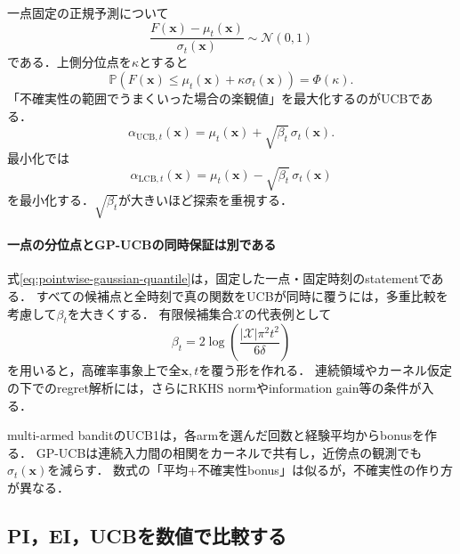 \documentclass[a4paper,11pt]{ltjsarticle}
\newcommand{\Pp}{\mathbb P}
\newcommand{\N}{\mathcal N}
\begin{document}
一点固定の正規予測について
\begin{equation}
  \frac{F(\bm x)-\mu_t(\bm x)}{\sigma_t(\bm x)}\sim\N(0,1)
\end{equation}
である．上側分位点を\(\kappa\)とすると
\begin{equation}
  \Pp\left(
  F(\bm x)\leq\mu_t(\bm x)+\kappa\sigma_t(\bm x)
  \right)=\Phi(\kappa).
  \label{eq:pointwise-gaussian-quantile}
\end{equation}
「不確実性の範囲でうまくいった場合の楽観値」を最大化するのがUCBである．
\begin{equation}
  \boxed{
  \alpha_{\mathrm{UCB},t}(\bm x)
  =\mu_t(\bm x)+\sqrt{\beta_t}\,\sigma_t(\bm x).}
  \label{eq:gp-ucb}
\end{equation}
最小化では
\begin{equation}
  \alpha_{\mathrm{LCB},t}(\bm x)
  =\mu_t(\bm x)-\sqrt{\beta_t}\,\sigma_t(\bm x)
  \label{eq:gp-lcb}
\end{equation}
を最小化する．\(\sqrt{\beta_t}\)が大きいほど探索を重視する．

\paragraph{一点の分位点とGP-UCBの同時保証は別である}
式\eqref{eq:pointwise-gaussian-quantile}は，固定した一点・固定時刻のstatementである．
すべての候補点と全時刻で真の関数をUCBが同時に覆うには，多重比較を考慮して\(\beta_t\)を大きくする．
有限候補集合\(\mathcal X\)の代表例として
\begin{equation}
  \beta_t
  =2\log\left(
  \frac{|\mathcal X|\pi^2t^2}{6\delta}
  \right)
  \label{eq:finite-domain-beta}
\end{equation}
を用いると，高確率事象上で全\(\bm x,t\)を覆う形を作れる\citep{srinivas2010gpucb}．
連続領域やカーネル仮定の下でのregret解析には，さらにRKHS normやinformation gain等の条件が入る．

\begin{cautionbox}
multi-armed banditのUCB1は，各armを選んだ回数と経験平均からbonusを作る．
GP-UCBは連続入力間の相関をカーネルで共有し，近傍点の観測でも\(\sigma_t(\bm x)\)を減らす．
数式の「平均+不確実性bonus」は似るが，不確実性の作り方が異なる．
\end{cautionbox}

\subsection{PI，EI，UCBを数値で比較する}
\end{document}
